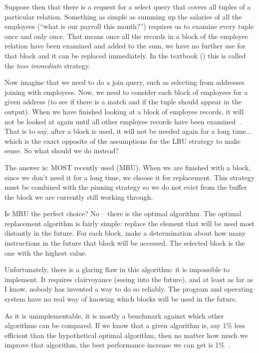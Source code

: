 \documentclass[a4paper]{report}
\begin{document}
Suppose then that there is a request for a select query that covers all tuples of a particular relation. Something as simple as summing up the salaries of all the employees (``what is our payroll this month?'') requires us to examine every tuple once and only once. That means once all the records in a block of the employee relation have been examined and added to the sum, we have no further use for that block and it can be replaced immediately. In the textbook (\cite{dsc}) this is called the \textit{toss immediate} strategy.

Now imagine that we need to do a join query, such as selecting from addresses joining with employees. Now, we need to consider each block of employees for a given address (to see if there is a match and if the tuple should appear in the output). When we have finished looking at a block of employee records, it will not be looked at again until all other employee records have been examined~\cite{dsc}. That is to say, after a block is used, it will not be needed again for a long time... which is the exact opposite of the assumptions for the LRU strategy to make sense. So what should we do instead?

The answer is: MOST recently used (MRU). When we are finished with a block, since we don't need it for a long time, we choose it for replacement. This strategy must be combined with the pinning strategy so we do not evict from the buffer the block we are currently still working through.

Is MRU the perfect choice? No -- there is the optimal algorithm. The optimal replacement algorithm is fairly simple: replace the element that will be used most distantly in the future. For each block, make a determination about how many instructions in the future that block will be accessed. The selected block is the one with the highest value.

Unfortunately, there is a glaring flaw in this algorithm: it is impossible to implement. It requires clairvoyance (seeing into the future), and at least as far as I know, nobody has invented a way to do so reliably. The program and operating system have no real way of knowing which blocks will be used in the future.

As it is unimplementable, it is mostly a benchmark against which other algorithms can be compared. If we know that a given algorithm is, say 1\% less efficient than the hypothetical optimal algorithm, then no matter how much we improve that algorithm, the best performance increase we can get is 1\%~\cite{mos}.
\end{document}
